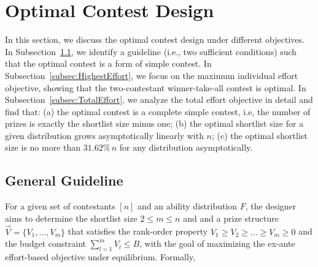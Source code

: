 \section{Optimal Contest Design}
\label{sec:optimal design}

In this section, we discuss the optimal contest design under different objectives. In Subsection~\ref{subsec:GeneralGuideline}, we identify a guideline (i.e., two sufficient conditions) such that the optimal contest is a form of simple contest.  In Subsection~\ref{subsec:HighestEffort}, we focus on the maximum individual effort objective, showing that the two-contestant winner-take-all contest is optimal. In Subsection~\ref{subsec:TotalEffort}, we analyze the total effort objective in detail and find that: (a) the optimal contest is a complete simple contest, i.e, the number of prizes is exactly the shortlist size minus one; (b) the optimal shortlist size for a given distribution grows asymptotically linearly with $n$; (c) the optimal shortlist size is no more than $31.62\%\,n$ for any distribution asymptotically.


\subsection{General Guideline}\label{subsec:GeneralGuideline}

For a given set of contestants $[n]$ and an ability distribution $F$, the designer aims to determine the shortlist size $2\leq m \leq n$ and and a prize structure $\vec{V}=\{V_1,\ldots,V_m\}$ that satisfies the rank-order property $V_1\geq V_2 \geq\ldots\geq V_m \geq 0$ and the budget constraint $\sum_{l=1}^mV_l \leq B$, with the goal of maximizing the ex-ante effort-based objective under equilibrium. Formally, 


